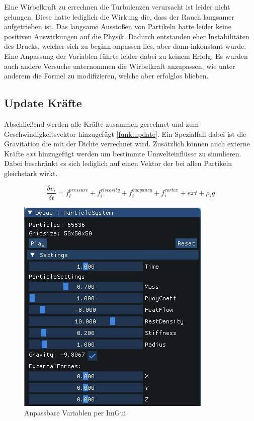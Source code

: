 \documentclass[intern,palatino]{cgBA}
\begin{document}
Eine Wirbelkraft zu errechnen die Turbulenzen verursacht ist leider nicht gelungen. Diese hatte lediglich die Wirkung die, dass der Rauch langsamer aufgetrieben ist. Das langsame Ausstoßen von Partikeln hatte leider keine positiven Auswirkungen auf die Physik. Dadurch entstanden eher Instabilitäten des Drucks, welcher sich zu beginn anpassen lies, aber dann inkonstant wurde. Eine Anpassung der Variablen führte leider dabei zu keinem Erfolg. Es wurden auch andere Versuche unternommen die Wirbelkraft anzupassen, wie unter anderem die Formel zu modifizieren, welche aber erfolglos blieben.


\subsection{Update Kräfte}\label{kräfte}

Abschließend werden alle Kräfte zusammen gerechnet und zum Geschwindigkeitsvektor hinzugefügt \ref{funk:update}. Ein Spezialfall dabei ist die Gravitation die mit der Dichte verrechnet wird. Zusätzlich können auch externe Kräfte $ext$ hinzugefügt werden um bestimmte Umwelteinflüsse zu simulieren. Dabei beschränkt es sich lediglich auf einen Vektor der bei allen Partikeln gleichstark wirkt.
\newline

\begin{equation}\label{funk:update}
\frac{\delta v_i}{\delta t}  = f^{pressure}_i + f^{viscosity}_i + f^{buoyancy}_i + f^{vortex}_i + ext + \rho_i g
\end{equation}

\begin{figure}[H]
	\centering
	\includegraphics[width=0.35\columnwidth]{Bilder/external.jpg}
	\caption{Anpassbare Variablen per ImGui}
	\label{img:ext}
\end{figure}
\newpage

\end{document}
